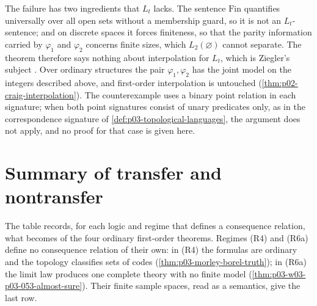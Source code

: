 The failure has two ingredients that \(L_t\) lacks. The sentence
\(\mathrm{Fin}\) quantifies universally over all open sets without a
membership guard, so it is not an \(L_t\)-sentence; and on discrete spaces
it forces finiteness, so that the parity information carried by
\(\varphi_1\) and \(\varphi_2\) concerns finite sizes, which
\(L_2(\varnothing)\) cannot separate. The theorem therefore says nothing
about interpolation for \(L_t\), which is Ziegler's subject
\cite[ch.~XV, \S2, from p.~560]{Ziegler1985TopologicalModelTheory}. Over
ordinary structures the pair \(\varphi_1,\varphi_2\) has the joint model
on the integers described above, and first-order interpolation is
untouched (\cref{thm:p02-craig-interpolation}). The counterexample uses a
binary point relation in each signature; when both point signatures
consist of unary predicates only, as in the correspondence signature of
\cref{def:p03-topological-languages}, the argument does not apply, and
no proof for that case is given here.

\section{Summary of transfer and nontransfer}
\label{sec:p03-w03-p03-053-summary}
The table records, for each logic and regime that defines a consequence
relation, what becomes of the four ordinary first-order theorems. Regimes
(R4) and (R6a) define no consequence relation of their own: in (R4) the
formulas are ordinary and the topology classifies sets of codes
(\cref{thm:p03-morley-borel-truth}); in (R6a) the limit law produces one
complete theory with no finite model
(\cref{thm:p03-w03-p03-053-almost-sure}). Their finite sample spaces, read
as a semantics, give the last row.

